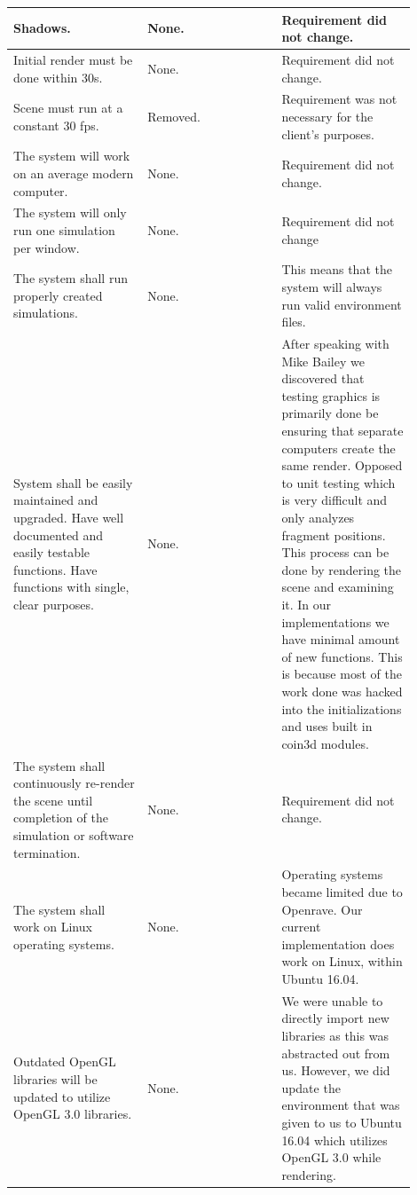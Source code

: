 \documentclass[10pt,journal,compsoc,draftclsnofoot]{IEEEtran}
\begin{document}
\begin{flushleft}
\begin{center}
\begin{table}[H]
\begin{tabular}{ | p{0.3\linewidth} | p{0.3\linewidth} | p{0.3\linewidth} | }
Shadows. & 
None. & 
Requirement did not change. \\ \hline

Initial render must be done within 30s. & 
None. & 
Requirement did not change. \\ \hline

Scene must run at a constant 30 fps. & 
Removed. & 
Requirement was not necessary for the client's purposes. \\ \hline

The system will work on an average modern computer. &
None. &
Requirement did not change. \\ \hline

The system will only run one simulation per window. &
None. &
Requirement did not change \\ \hline

The system shall run properly created simulations. &
None. &
This means that the system will always run valid environment files. \\ \hline

System shall be easily maintained and upgraded.
Have well documented and easily testable functions.
Have functions with single, clear purposes. &
None. &
After speaking with Mike Bailey we discovered that testing graphics is primarily done be ensuring that separate computers create the same render. 
Opposed to unit testing which is very difficult and only analyzes fragment positions.
This process can be done by rendering the scene and examining it. 
In our implementations we have minimal amount of new functions.
This is because most of the work done was hacked into the initializations and uses built in coin3d modules. \\ \hline

The system shall continuously re-render the scene until completion of the simulation or software termination. &
None. &
Requirement did not change. \\ \hline

The system shall work on Linux operating systems. &
None. &
Operating systems became limited due to Openrave.
Our current implementation does work on Linux, within Ubuntu 16.04. \\ \hline

Outdated OpenGL libraries will be updated to utilize OpenGL 3.0 libraries. &
None. &
We were unable to directly import new libraries as this was abstracted out from us.
However, we did update the environment that was given to us to Ubuntu 16.04 which utilizes OpenGL 3.0 while rendering. \\ \hline


\end{tabular}
\end{table}
\end{center}
\end{flushleft}
\end{document}
